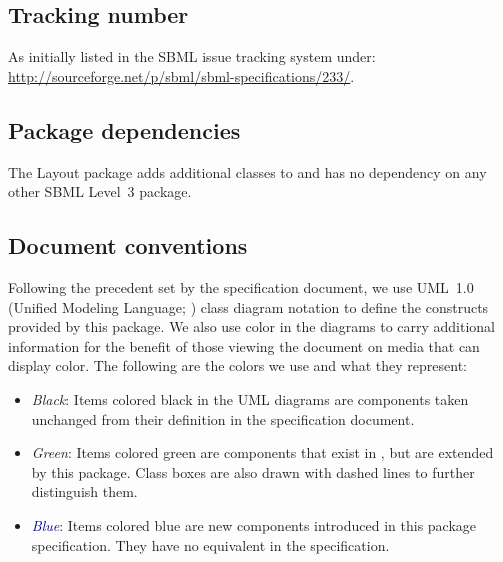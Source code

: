 \subsection{Tracking number}
As initially listed in the SBML issue tracking system under: \\
\url{http://sourceforge.net/p/sbml/sbml-specifications/233/}.

\subsection{Package dependencies}

The Layout package adds additional classes to \sbmlthreecore and has no 
dependency on any other SBML Level~3 package.


\subsection{Document conventions}

\label{conventions}

Following the precedent set by the \sbmlthreecore specification
document, we use UML~1.0 (Unified Modeling Language;
\citealt{eriksson:1998,oestereich:1999}) class diagram notation to
define the constructs provided by this package.  We also use color in
the diagrams to carry additional information for the benefit of those
viewing the document on media that can display color.  The following are
the colors we use and what they represent:

\begin{itemize}

\item[\raisebox{2.75pt}{\colorbox{black}{\rule{0.8pt}{0.8pt}}}]
  \emph{Black}: Items colored black in the UML diagrams are components
  taken unchanged from their definition in the \sbmlthreecore
  specification document.

\item[\raisebox{2.75pt}{\colorbox{mediumgreen}{\rule{0.8pt}{0.8pt}}}]
  \emph{\textcolor{mediumgreen}{Green}}: Items colored green are
  components that exist in \sbmlthreecore, but are extended by this
  package.  Class boxes are also drawn with dashed lines to further
  distinguish them.

\item[\raisebox{2.75pt}{\colorbox{darkblue}{\rule{0.8pt}{0.8pt}}}]
  \emph{\textcolor{darkblue}{Blue}}: Items colored blue are new
  components introduced in this package specification.  They have no
  equivalent in the \sbmlthreecore specification.

\end{itemize}

